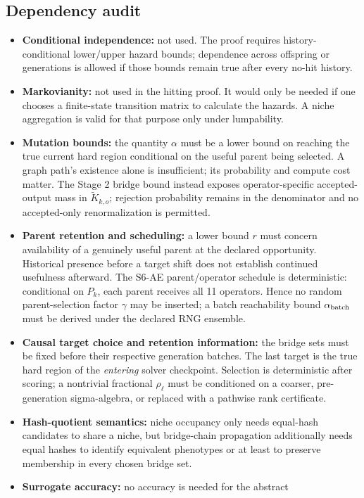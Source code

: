 \subsection{Dependency audit}
\begin{itemize}
\item \textbf{Conditional independence:} not used. The proof requires
history-conditional lower/upper hazard bounds; dependence across offspring or
generations is allowed if those bounds remain true after every no-hit history.
\item \textbf{Markovianity:} not used in the hitting proof. It would only be
needed if one chooses a finite-state transition matrix to calculate the
hazards. A niche aggregation is valid for that purpose only under lumpability.
\item \textbf{Mutation bounds:} the quantity $\alpha$ must be a lower bound
on reaching the true current hard region conditional on the useful parent
being selected. A graph path's existence alone is insufficient; its
probability and compute cost matter.
The Stage 2 bridge bound instead exposes operator-specific accepted-output
mass in $\widetilde K_{k,o}$; rejection probability remains in the denominator
and no accepted-only renormalization is permitted.
\item \textbf{Parent retention and scheduling:} a lower bound $r$ must concern
availability of a genuinely useful parent at the declared opportunity.
Historical presence before a target shift does not establish continued
usefulness afterward. The S6-AE parent/operator schedule is deterministic:
conditional on $P_k$, each parent receives all 11 operators. Hence no random
parent-selection factor $\gamma$ may be inserted; a batch reachability bound
$\alpha_{\rm batch}$ must be derived under the declared RNG ensemble.
\item \textbf{Causal target choice and retention information:} the bridge
sets must be fixed before their respective generation batches. The last
target is the true hard region of the \emph{entering} solver checkpoint.
Selection is deterministic after scoring; a nontrivial fractional
$\rho_\ell$ must be conditioned on a coarser, pre-generation sigma-algebra,
or replaced with a pathwise rank certificate.
\item \textbf{Hash-quotient semantics:} niche occupancy only needs
equal-hash candidates to share a niche, but bridge-chain propagation
additionally needs equal hashes to identify equivalent phenotypes or
at least to preserve membership in every chosen bridge set.
\item \textbf{Surrogate accuracy:} no accuracy is needed for the abstract

\end{itemize}

